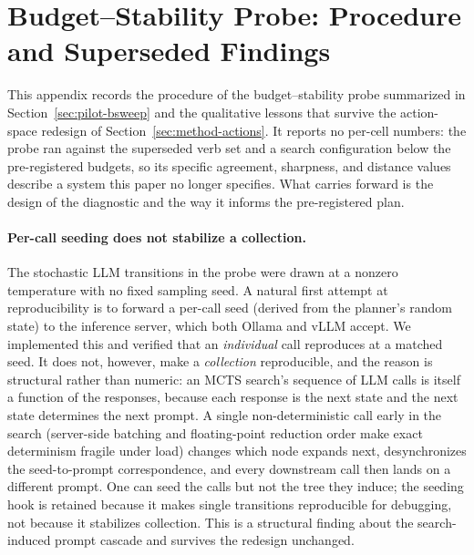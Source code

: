 \section{Budget--Stability Probe: Procedure and Superseded Findings}
\label{app:bsweep}


This appendix records the procedure of the budget--stability probe summarized in
Section~\ref{sec:pilot-bsweep} and the qualitative lessons that survive the
action-space redesign of Section~\ref{sec:method-actions}. It reports no per-cell
numbers: the probe ran against the superseded verb set and a search
configuration below the pre-registered budgets, so its specific agreement,
sharpness, and distance values describe a system this paper no longer specifies.
What carries forward is the design of the diagnostic and the way it informs the
pre-registered plan.

\paragraph{Per-call seeding does not stabilize a collection.} The stochastic LLM
transitions in the probe were drawn at a nonzero temperature with no fixed
sampling seed. A natural first attempt at reproducibility is to forward a
per-call seed (derived from the planner's random state) to the inference server,
which both Ollama and vLLM accept. We implemented this and verified that an
\emph{individual} call reproduces at a matched seed. It does not, however, make a
\emph{collection} reproducible, and the reason is structural rather than
numeric: an MCTS search's sequence of LLM calls is itself a function of the
responses, because each response is the next state and the next state determines
the next prompt. A single non-deterministic call early in the search
(server-side batching and floating-point reduction order make exact determinism
fragile under load) changes which node expands next, desynchronizes the
seed-to-prompt correspondence, and every downstream call then lands on a
different prompt. One can seed the calls but not the tree they induce; the
seeding hook is retained because it makes single transitions reproducible for
debugging, not because it stabilizes collection. This is a structural finding
about the search-induced prompt cascade and survives the redesign unchanged.

